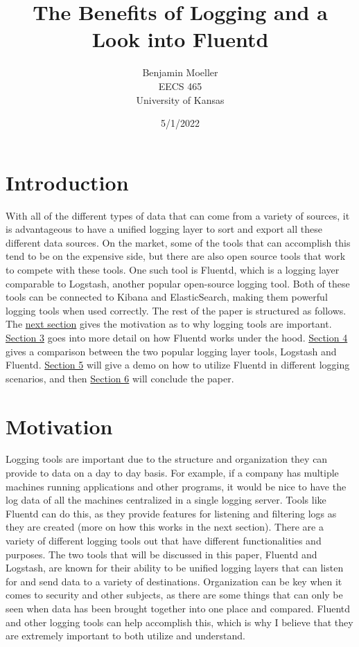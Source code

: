\documentclass{article}
\title{The Benefits of Logging and a Look into Fluentd}
\author{Benjamin Moeller \\ EECS 465 \\ University of Kansas}
\date{5/1/2022}
\begin{document}
\maketitle

\section{Introduction} \label{sec: intro}
\quad \quad 
With all of the different types of data that can come from a variety of sources, it is advantageous
to have a unified logging layer to sort and export all these different data sources. On the market, some
of the tools that can accomplish this tend to be on the expensive side, but there are also open source tools that
work to compete with these tools. One such tool is Fluentd, which is a logging layer comparable to
Logstash, another popular open-source logging tool. Both of these tools can be connected to Kibana and ElasticSearch, 
making them powerful logging tools when used correctly. The rest of the paper is structured as follows. The 
\hyperref[sec:motiv]{next section} gives the motivation as to why logging tools are important. 
\hyperref[sec:works]{Section 3} goes into more detail on how Fluentd works under the hood. \hyperref[sec:comp]{Section 4} gives a comparison between the two popular logging layer tools, Logstash 
and Fluentd. \hyperref[sec:demo]{Section 5} will give a demo on how to utilize Fluentd in different logging scenarios, and then \hyperref[sec:conclude]{Section 6} will conclude the paper.
\section{Motivation} \label{sec:motiv}
\quad \quad 
Logging tools are important due to the structure and organization they can provide to data on a day to 
day basis. For example, if a company has multiple machines running applications and other programs, it would be nice 
to have the log data of all the machines centralized in a single logging server. Tools like Fluentd can do this, as 
they provide features for listening and filtering logs as they are created (more on how this works in the next section). 
There are a variety of different logging tools out that have different functionalities and purposes. The two tools
that will be discussed in this paper, Fluentd and Logstash, are known for their ability to be unified logging layers that can
listen for and send data to a variety of destinations. Organization can be key when it comes to security and other subjects,
as there are some things that can only be seen when data has been brought together into one place and compared. Fluentd and other logging tools can help accomplish this, which is
why I believe that they are extremely important to both utilize and understand.
\end{document}
